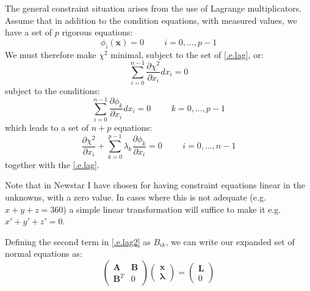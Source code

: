 The general constraint situation arises from the use of Lagrange
multiplicators. Assume that in addition to the condition equations, with
measured values, we have a set of $p$ rigorous equations:
\begin{equation}
	\phi_i(\mathbf{x})=0 \hspace{1cm} i=0,\ldots,p-1
\label{.e.lag}
\end{equation}
We must therefore make $\chi^{2}$ minimal, subject to the set of
\eqref{.e.lag}, or:
\begin{equation}
	\sum_{i=0}^{n-1}\frac{\partial \chi^{2}}{\partial x_{i}}dx_{i}=0
\end{equation}
subject to the conditions:
\begin{equation}
	\sum_{i=0}^{n-1}\frac{\partial \phi_{k}}{\partial x_{i}}dx_{i}
		=0 \hspace {1cm} k=0,\dots,p-1
\end{equation}
which leads to a set of $n+p$ equations:
\begin{equation}
	\frac{\partial \chi^{2}}{\partial x_{i}} +
	\sum_{k=0}^{p-1}\lambda_{k}\frac{\partial \phi_{k}}{\partial x_{i}}=0
	\hspace{1cm} i=0,\ldots,n-1
\label{.e.lag2}
\end{equation}
together with the \eqref{.e.lag}.

Note that in Newstar I have chosen for having constraint equations linear in
the unknowns, with a zero value. In cases where this is not adequate (e.g.
$x+y+z=360$) a simple linear transformation will suffice to make it e.g.
$x'+y'+z'=0$.

Defining the second term in \eqref{.e.lag2} as $B_{ik}$, we can write our
expanded set of normal equations as:
\begin{equation}
	\left(\begin{array} {cc}
	      \mathbf{A} & \mathbf{B} \\
		\mathbf{B}^{T} & 0
	      \end{array} \right)
	\left(\begin{array} {c}
	      \mathbf{x} \\
		\mathbf{\lambda}
	      \end{array} \right) =
	\left( \begin{array} {c}
	       \mathbf{L} \\
		0
	       \end{array}\right)
\label{.e.xnorm}
\end{equation}

